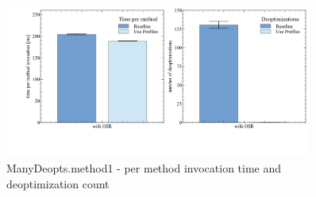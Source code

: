 \begin{figure}[ht]
  \begin{center}
    \centering
    \includegraphics[width=0.9\textwidth]{figures/manydeopt.png}
    \caption{ManyDeopts.method1 - per method invocation time and deoptimization count}
    \label{f:manydeopts}
  \end{center}
\end{figure}
